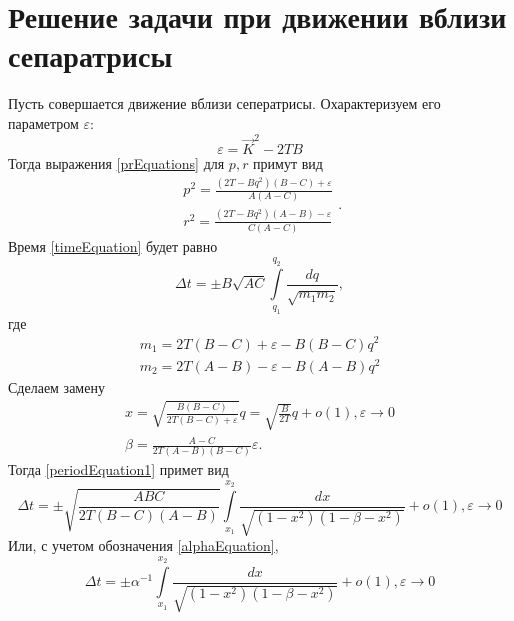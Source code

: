\documentclass{article}
\begin{document}
\section{Решение задачи при движении вблизи сепаратрисы}
Пусть совершается движение вблизи сеператрисы. Охарактеризуем его параметром \begin{math} \varepsilon \end{math}:
\begin{equation}
\varepsilon=\vec{K}^2-2TB
\end{equation}
Тогда выражения \ref{prEquations} для \begin{math} p, r \end{math} примут вид
\begin{equation}
\begin{array}{l}
p^2=\frac{(2T-Bq^2)(B-C)+\varepsilon}{A(A-C)}\\
r^2=\frac{(2T-Bq^2)(A-B)-\varepsilon}{C(A-C)}
\end{array}.
\end{equation}
Время \ref{timeEquation} будет равно
\begin{equation}
\label{periodEquation1}
\Delta t=\pm B\sqrt{AC}{\int\limits_{q_1}^{q_2}\frac{dq}{\sqrt{m_1m_2}}},
\end{equation}
где
\begin{equation}
\begin{array}{clr}
m_1=2T(B-C)+\varepsilon-B(B-C)q^2\\
m_2=2T(A-B)-\varepsilon-B(A-B)q^2
\end{array}
\end{equation}
Сделаем замену
\begin{equation}
\begin{array}{l}
x=\sqrt{\frac{B(B-C)}{2T(B-C)+\varepsilon}}q=\sqrt{\frac{B}{2T}}q+o(1), \varepsilon\rightarrow 0\\
\beta=\frac{A-C}{2T(A-B)(B-C)}\varepsilon.
\end{array}
\end{equation}
Тогда \ref{periodEquation1} примет вид
\begin{equation}
\label{timeFinalEquation}
\Delta t=\pm \sqrt{\frac{ABC}{2T(B-C)(A-B)}}{\int\limits_{x_1}^{x_2}\frac{dx}{\sqrt{(1-x^2)(1-\beta-x^2)}}}+o(1),\varepsilon\rightarrow 0
\end{equation}
Или, с учетом обозначения \ref{alphaEquation},
\begin{equation}
\Delta t=\pm \alpha^{-1}{\int\limits_{x_1}^{x_2}\frac{dx}{\sqrt{(1-x^2)(1-\beta-x^2)}}}+o(1),\varepsilon\rightarrow 0
\end{equation}
\end{document}
